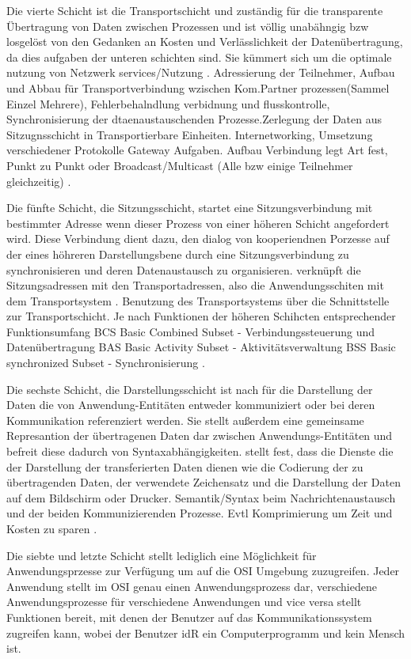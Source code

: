 Die vierte Schicht ist die Transportschicht und zuständig für die transparente Übertragung von Daten zwischen Prozessen und ist völlig unabähngig bzw losgelöst von den Gedanken an Kosten und Verlässlichkeit der Datenübertragung, da dies aufgaben der unteren schichten sind. Sie kümmert sich um die optimale nutzung von Netzwerk services/Nutzung \cite[S.~37f.]{osi96}.
Adressierung der Teilnehmer, Aufbau und Abbau für Transportverbindung wzischen Kom.Partner prozessen(Sammel Einzel Mehrere), Fehlerbehalndlung verbidnung und flusskontrolle, Synchronisierung der dtaenaustauschenden Prozesse.Zerlegung der Daten aus Sitzugnsschicht in Transportierbare Einheiten. Internetworking, Umsetzung verschiedener Protokolle Gateway Aufgaben. Aufbau Verbindung legt Art fest, Punkt zu Punkt oder Broadcast/Multicast (Alle bzw einige Teilnehmer gleichzeitig) \cite[S.~12f.]{schn06}.

Die fünfte Schicht, die Sitzungsschicht, startet eine Sitzungsverbindung mit bestimmter Adresse wenn dieser Prozess von einer höheren Schicht angefordert wird. Diese Verbindung dient dazu, den  dialog von kooperiendnen Porzesse auf der eines höhreren Darstellungsbene durch eine Sitzungsverbindung zu synchronisieren und deren Datenaustausch zu organisieren. verknüpft die Sitzungsadressen mit den Transportadressen, also die Anwendungsschiten mit dem Transportsystem \cite[S.~35]{osi96}.
Benutzung des Transportsystems über die Schnittstelle zur Transportschicht. Je nach Funktionen der höheren Schihcten entsprechender Funktionsumfang
BCS Basic Combined Subset - Verbindungssteuerung und Datenübertragung
BAS Basic Activity Subset - Aktivitätsverwaltung
BSS Basic synchronized Subset - Synchronisierung
\cite[S.~13]{schn06}.


Die sechste Schicht, die Darstellungsschicht ist nach \cite[S.~33f.]{osi96} für die Darstellung der Daten die von Anwendung-Entitäten entweder kommuniziert oder bei deren Kommunikation referenziert werden. Sie stellt außerdem eine gemeinsame Represantion der übertragenen Daten dar zwischen Anwendungs-Entitäten und befreit diese dadurch von Syntaxabhängigkeiten.
\cite[S.~13f.]{schn06} stellt fest, dass die Dienste die der Darstellung der transferierten Daten dienen wie die Codierung der zu übertragenden Daten, der verwendete Zeichensatz und die Darstellung der Daten auf dem Bildschirm oder Drucker. Semantik/Syntax beim Nachrichtenaustausch und der beiden Kommunizierenden Prozesse. Evtl Komprimierung um Zeit und Kosten zu sparen .


Die siebte und letzte Schicht stellt lediglich eine Möglichkeit für Anwendungsprzesse zur Verfügung um auf die OSI Umgebung zuzugreifen. Jeder Anwendung stellt im OSI genau einen Anwendungsprozess dar, verschiedene Anwendungsprozesse für verschiedene Anwendungen und vice versa \cite[S.~32]{osi96}
stellt Funktionen bereit, mit denen der Benutzer auf das Kommunikationssystem zugreifen kann, wobei der Benutzer idR ein Computerprogramm und kein Mensch ist. \cite[S.~14]{schn06}

